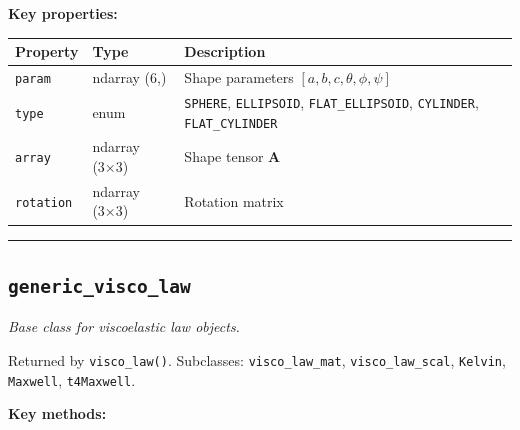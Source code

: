 \documentclass[
  a4paper,
  numbers=noendperiod,
  DIV=12]{scrreprt}
\newcounter{none} %
\newcommand{\uu}[1]{{\symbf{{#1}}}}
\begin{document}
\textbf{Key properties:}

{\def\LTcaptype{none} %
\begin{longtable}[]{@{}
  >{\raggedright\arraybackslash}p{}
  >{\raggedright\arraybackslash}p{}
  >{\raggedright\arraybackslash}p{}@{}}
\toprule\noalign{}
\begin{minipage}[b]{\linewidth}\raggedright
Property
\end{minipage} & \begin{minipage}[b]{\linewidth}\raggedright
Type
\end{minipage} & \begin{minipage}[b]{\linewidth}\raggedright
Description
\end{minipage} \\
\midrule\noalign{}
\endhead
\bottomrule\noalign{}
\endlastfoot
\texttt{param} & ndarray (6,) & Shape parameters
\([a,b,c,\theta,\phi,\psi]\) \\
\texttt{type} & enum & \texttt{SPHERE}, \texttt{ELLIPSOID},
\texttt{FLAT\_ELLIPSOID}, \texttt{CYLINDER}, \texttt{FLAT\_CYLINDER} \\
\texttt{array} & ndarray (3×3) & Shape tensor \(\uu{A}\) \\
\texttt{rotation} & ndarray (3×3) & Rotation matrix \\
\end{longtable}
}

\begin{center}\rule{0.5\linewidth}{0.5pt}\end{center}

\subsection{\texorpdfstring{\texttt{generic\_visco\_law}}{generic\_visco\_law}}\label{api-generic-visco-law}

\emph{Base class for viscoelastic law objects.}

Returned by \texttt{visco\_law()}. Subclasses: \texttt{visco\_law\_mat},
\texttt{visco\_law\_scal}, \texttt{Kelvin}, \texttt{Maxwell},
\texttt{t4Maxwell}.

\textbf{Key methods:}
\end{document}
